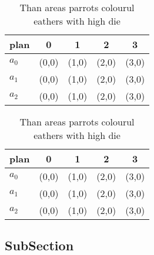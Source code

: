 \documentclass[a4paper]{article}
\begin{document}
\begin{table}
\begin{adjustbox}{width=0.6\columnwidth}
\begin{tabular}{|l|l|l|l|l|}
\hline
\textbf{plan} & \multicolumn{1}{c|}{\textbf{0}} & \multicolumn{1}{c|}{\textbf{1}} & \multicolumn{1}{c|}{\textbf{2}} & \multicolumn{1}{c|}{\textbf{3}} \\ \hline
\textbf{$a_0$}  & (0,0) & (1,0) & (2,0) & (3,0) \\ \hline
\textbf{$a_1$}  & (0,0) & (1,0) & (2,0) & (3,0) \\ \hline
\textbf{$a_2$}  & (0,0) & (1,0) & (2,0) & (3,0) \\ \hline
\end{tabular}
\end{adjustbox}
\caption{Than areas parrots colourul eathers with high die
}
\end{table}

\begin{table}
\begin{adjustbox}{width=0.6\columnwidth}
\begin{tabular}{|l|l|l|l|l|}
\hline
\textbf{plan} & \multicolumn{1}{c|}{\textbf{0}} & \multicolumn{1}{c|}{\textbf{1}} & \multicolumn{1}{c|}{\textbf{2}} & \multicolumn{1}{c|}{\textbf{3}} \\ \hline
\textbf{$a_0$}  & (0,0) & (1,0) & (2,0) & (3,0) \\ \hline
\textbf{$a_1$}  & (0,0) & (1,0) & (2,0) & (3,0) \\ \hline
\textbf{$a_2$}  & (0,0) & (1,0) & (2,0) & (3,0) \\ \hline
\end{tabular}
\end{adjustbox}
\caption{Than areas parrots colourul eathers with high die
}
\end{table}

\subsection{SubSection}
\end{document}
